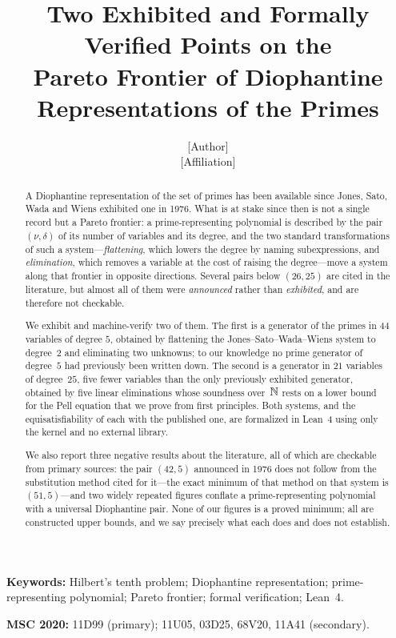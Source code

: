 \title{Two Exhibited and Formally Verified Points on the\\
       Pareto Frontier of Diophantine Representations of the Primes}

\author{[Author]\\\small [Affiliation]}
\date{}

\maketitle

\begin{abstract}
A Diophantine representation of the set of primes has been available since
Jones, Sato, Wada and Wiens exhibited one in 1976. What is at stake since then
is not a single record but a Pareto frontier: a prime-representing polynomial is
described by the pair $(\nu,\delta)$ of its number of variables and its degree,
and the two standard transformations of such a system---\emph{flattening},
which lowers the degree by naming subexpressions, and \emph{elimination}, which
removes a variable at the cost of raising the degree---move a system along that
frontier in opposite directions. Several pairs below $(26,25)$ are cited in the
literature, but almost all of them were \emph{announced} rather than
\emph{exhibited}, and are therefore not checkable.

We exhibit and machine-verify two of them. The first is a generator of the
primes in $44$ variables of degree $5$, obtained by flattening the
Jones--Sato--Wada--Wiens system to degree~$2$ and eliminating two unknowns; to
our knowledge no prime generator of degree~$5$ had previously been written down.
The second is a generator in $21$ variables of degree~$25$, five fewer variables
than the only previously exhibited generator, obtained by five linear
eliminations whose soundness over~$\mathbb{N}$ rests on a lower bound for the Pell
equation that we prove from first principles. Both systems, and the
equisatisfiability of each with the published one, are formalized in Lean~4
using only the kernel and no external library.

We also report three negative results about the literature, all of which are
checkable from primary sources: the pair $(42,5)$ announced in 1976 does not
follow from the substitution method cited for it---the exact minimum of that
method on that system is $(51,5)$---and two widely repeated figures conflate a
prime-representing polynomial with a universal Diophantine pair. None of our
figures is a proved minimum; all are constructed upper bounds, and we say
precisely what each does and does not establish.
\end{abstract}

\noindent\textbf{Keywords:} Hilbert's tenth problem; Diophantine representation;
prime-representing polynomial; Pareto frontier; formal verification; Lean~4.

\smallskip
\noindent\textbf{MSC 2020:} 11D99 (primary); 11U05, 03D25, 68V20, 11A41
(secondary).
